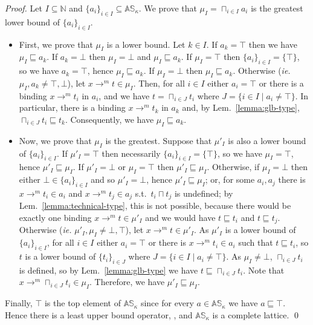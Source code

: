 \begin{proof}
  Let $I\subseteq\mathbb{N}$ and $\{a_i\}_{i\in I}\subseteq\mathbb{AS}_\kappa$.
  We prove that $\mu_I=\sqcap_{i\in I}a_i$ is the greatest lower bound of
  $\{a_i\}_{i\in I}$.
  \begin{itemize}
    \item First, we prove that $\mu_I$ is a lower bound.
    Let $k\in I$.
    If $a_k=\top$ then we have $\mu_I \sqsubseteq a_k$.
    If $a_k=\bot$ then $\mu_I=\bot$ and $\mu_I\sqsubseteq a_k$.
    If $\mu_I = \top$ then $\{a_i\}_{i\in I}=\{\top\}$, so we have $a_k=\top$,
    hence $\mu_I \sqsubseteq a_k$.
    If $\mu_I=\bot$ then $\mu_I\sqsubseteq a_k$.
    Otherwise (\textit{ie.} $\mu_I,a_k\neq\top,\bot$),
    let $x\to^m t\in \mu_I$. Then, for all $i\in I$ either
    $a_i=\top$ or there is a binding $x\to^m t_i$ in $a_i$, and we have
    $t = \sqcap_{i\in J}t_i$ where $J=\{i\in I\mid a_i\neq\top\}$. In particular,
    there is a binding $x\to^m t_k$ in $a_k$ and, by Lem.~\ref{lemma:glb-type},
    $\sqcap_{i\in J}t_i \sqsubseteq t_k$. Consequently, we have
    $\mu_I \sqsubseteq a_k$.
    \item Now, we prove that $\mu_I$ is the greatest.
    Suppose that $\mu'_I$ is also a lower bound of $\{a_i\}_{i\in I}$.
    If $\mu'_I=\top$ then necessarily $\{a_i\}_{i\in I}=\{\top\}$, so
    we have $\mu_I=\top$, hence $\mu'_I \sqsubseteq \mu_I$.
    If $\mu'_I=\bot$ or $\mu_I=\top$ then $\mu'_I \sqsubseteq \mu_I$.
    Otherwise, if $\mu_I=\bot$ then either $\bot\in\{a_i\}_{i\in I}$ and so
    $\mu'_I=\bot$, hence $\mu'_I \sqsubseteq \mu_I$; or, for some
    $a_i,a_j$ there is  $x\to^m t_i\in a_i$ and $x\to^m t_j\in a_j$ s.t.\
    $t_i\sqcap t_j$ is undefined; by Lem.~\ref{lemma:technical-type}, this
    is not possible, because there would be exactly one binding
    $x\to^m t\in\mu'_I$ and we would have $t \sqsubseteq t_i$ and
    $t \sqsubseteq t_j$.
    Otherwise (\textit{ie.} $\mu'_I,\mu_I\neq\bot,\top$),
    let $x\to^m t\in \mu'_I$. As $\mu'_I$ is a lower bound of $\{a_i\}_{i\in I}$,
    for all $i\in I$ either $a_i=\top$ or there is $x\to^m t_i\in a_i$ such
    that $t\sqsubseteq t_i$, so $t$ is a lower bound of $\{t_i\}_{i\in J}$
    where $J=\{i\in I\mid a_i\neq\top\}$.
    As $\mu_I\neq\bot$, $\sqcap_{i\in J}t_i$ is defined, so by Lem.~\ref{lemma:glb-type}
    we have $t\sqsubseteq \sqcap_{i\in J}t_i$. Note that
    $x\to^m \sqcap_{i\in J}t_i\in \mu_I$. Therefore, we have
    $\mu'_I \sqsubseteq \mu_I$.
  \end{itemize}

  Finally, $\top$ is the top element of $\mathbb{AS}_\kappa$
  since for every $a\in\mathbb{AS}_\kappa$ we have $a\sqsubseteq\top$.
  Hence there is a least upper bound operator, ,
  and $\mathbb{AS}_\kappa$ is a complete lattice.
  \qed
\end{proof}

